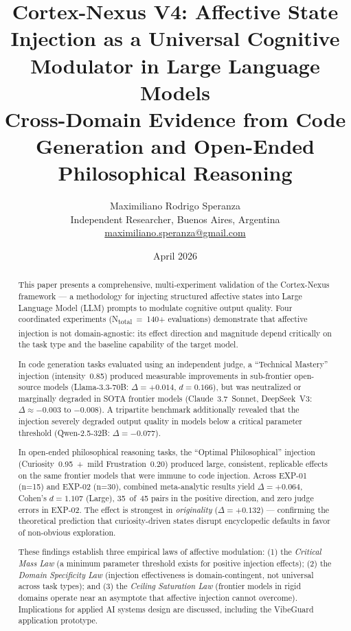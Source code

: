 \documentclass[12pt, a4paper]{article}
\title{\textbf{Cortex-Nexus V4: Affective State Injection as a Universal Cognitive Modulator in Large Language Models}\\
\large{Cross-Domain Evidence from Code Generation and Open-Ended Philosophical Reasoning}}
\author{
  Maximiliano Rodrigo Speranza\\
  \small{Independent Researcher, Buenos Aires, Argentina}\\
  \small{\href{mailto:maximiliano.speranza@gmail.com}{maximiliano.speranza@gmail.com}}
}
\date{April 2026}
\begin{document}
\maketitle
\begin{abstract}
This paper presents a comprehensive, multi-experiment validation of the Cortex-Nexus framework — a methodology for injecting structured affective states into Large Language Model (LLM) prompts to modulate cognitive output quality. Four coordinated experiments (N\textsubscript{total}~=~140+ evaluations) demonstrate that affective injection is not domain-agnostic: its effect direction and magnitude depend critically on the task type and the baseline capability of the target model.

In code generation tasks evaluated using an independent judge, a ``Technical Mastery'' injection (intensity~0.85) produced measurable improvements in sub-frontier open-source models (Llama-3.3-70B: $\Delta = +0.014$, $d = 0.166$), but was neutralized or marginally degraded in SOTA frontier models (Claude~3.7~Sonnet, DeepSeek~V3: $\Delta \approx -0.003$ to $-0.008$). A tripartite benchmark additionally revealed that the injection severely degraded output quality in models below a critical parameter threshold (Qwen-2.5-32B: $\Delta = -0.077$).

In open-ended philosophical reasoning tasks, the ``Optimal Philosophical'' injection (Curiosity~0.95~+~mild Frustration~0.20) produced large, consistent, replicable effects on the same frontier models that were immune to code injection. Across EXP-01 (n=15) and EXP-02 (n=30), combined meta-analytic results yield $\Delta = +0.064$, Cohen's $d = 1.107$ (Large), 35~of~45 pairs in the positive direction, and zero judge errors in EXP-02. The effect is strongest in \textit{originality} ($\Delta = +0.132$) — confirming the theoretical prediction that curiosity-driven states disrupt encyclopedic defaults in favor of non-obvious exploration.

These findings establish three empirical laws of affective modulation: (1) the \textit{Critical Mass Law} (a minimum parameter threshold exists for positive injection effects); (2) the \textit{Domain Specificity Law} (injection effectiveness is domain-contingent, not universal across task types); and (3) the \textit{Ceiling Saturation Law} (frontier models in rigid domains operate near an asymptote that affective injection cannot overcome). Implications for applied AI systems design are discussed, including the VibeGuard application prototype.
\end{abstract}
\end{document}
